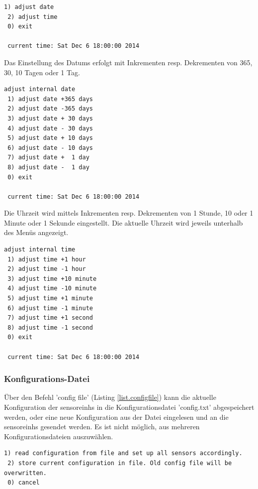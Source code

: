 \begin{lstlisting}[caption=Untermenü interne Uhr, label=list.intclock]
 1) adjust date
 2) adjust time
 0) exit

 current time: Sat Dec 6 18:00:00 2014
\end{lstlisting}

Das Einstellung des Datums erfolgt mit Inkrementen resp. Dekrementen von 365, 30, 10 Tagen oder 1 Tag.

\begin{lstlisting}[caption=Untermenü Datum einstellen, label=list.setdate]
adjust internal date
 1) adjust date +365 days
 2) adjust date -365 days
 3) adjust date + 30 days
 4) adjust date - 30 days
 5) adjust date + 10 days
 6) adjust date - 10 days
 7) adjust date +  1 day
 8) adjust date -  1 day
 0) exit

 current time: Sat Dec 6 18:00:00 2014
\end{lstlisting}

Die Uhrzeit wird mittels Inkrementen resp. Dekrementen von 1 Stunde, 10 oder 1 Minute oder 1 Sekunde eingestellt. Die aktuelle Uhrzeit wird jeweils unterhalb des Menüs angezeigt.

\begin{lstlisting}[caption=Untermenü Uhrzeit einstellen, label=list.settime]
adjust internal time
 1) adjust time +1 hour
 2) adjust time -1 hour
 3) adjust time +10 minute
 4) adjust time -10 minute
 5) adjust time +1 minute
 6) adjust time -1 minute
 7) adjust time +1 second
 8) adjust time -1 second
 0) exit

 current time: Sat Dec 6 18:00:00 2014
\end{lstlisting}

\subsubsection{Konfigurations-Datei}\label{sssec.configfile}

Über den Befehl 'config file' (Listing \ref{list.configfile}) kann die aktuelle Konfiguration der \glspl{sensoreinh} in die Konfigurationsdatei 'config.txt' abgespeichert werden, oder eine neue Konfiguration aus der Datei eingelesen und an die \glspl{sensoreinh} gesendet werden. Es ist nicht möglich, aus mehreren Konfigurationsdateien auszuwählen.

\begin{lstlisting}[caption=Untermenü Konfigurationsdatei, label=list.config]
 1) read configuration from file and set up all sensors accordingly.
 2) store current configuration in file. Old config file will be overwritten.
 0) cancel
\end{lstlisting}

